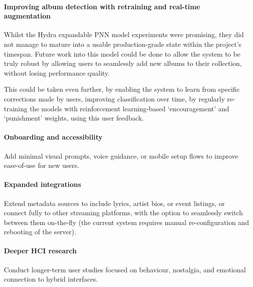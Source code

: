           \paragraph{Improving album detection with retraining and real-time augmentation}
    
          Whilst the Hydra expandable PNN model experiments were promising, they did not manage to mature into a usable production-grade state within the project's timespan. Future work into this model could be done to allow the system to be truly robust by allowing users to seamlessly add new albums to their collection, without losing performance quality.
    
          This could be taken even further, by enabling the system to learn from specific corrections made by users, improving classification over time, by regularly re-training the models with reinforcement learning-based `encouragement' and `punishment' weights, using this user feedback.
    
          \paragraph{Onboarding and accessibility}
    
          Add minimal visual prompts, voice guidance, or mobile setup flows to improve ease-of-use for new users.
    
          \paragraph{Expanded integrations}
    
          Extend metadata sources to include lyrics, artist bios, or event listings, or connect fully to other streaming platforms, with the option to seamlessly switch between them on-the-fly (the current system requires manual re-configuration and rebooting of the server).
    
          \paragraph{Deeper HCI research}
    
           Conduct longer-term user studies focused on behaviour, nostalgia, and emotional connection to hybrid interfaces.
    
    \printbibliography[title={References},heading=bibintoc] %
    

